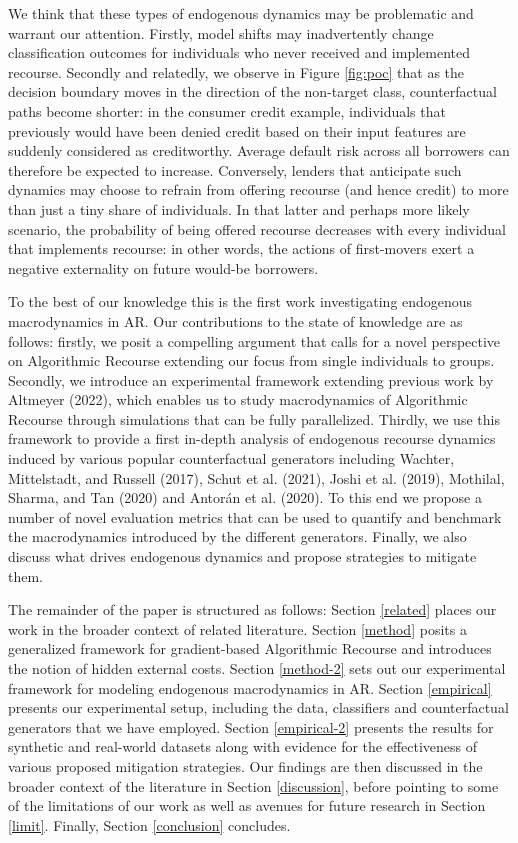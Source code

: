 \documentclass[conference,final,]{IEEEtran}
\begin{document}
We think that these types of endogenous dynamics may be problematic and warrant our attention. Firstly, model shifts may inadvertently change classification outcomes for individuals who never received and implemented recourse. Secondly and relatedly, we observe in Figure \ref{fig:poc} that as the decision boundary moves in the direction of the non-target class, counterfactual paths become shorter: in the consumer credit example, individuals that previously would have been denied credit based on their input features are suddenly considered as creditworthy. Average default risk across all borrowers can therefore be expected to increase. Conversely, lenders that anticipate such dynamics may choose to refrain from offering recourse (and hence credit) to more than just a tiny share of individuals. In that latter and perhaps more likely scenario, the probability of being offered recourse decreases with every individual that implements recourse: in other words, the actions of first-movers exert a negative externality on future would-be borrowers.

To the best of our knowledge this is the first work investigating endogenous macrodynamics in AR. Our contributions to the state of knowledge are as follows: firstly, we posit a compelling argument that calls for a novel perspective on Algorithmic Recourse extending our focus from single individuals to groups. Secondly, we introduce an experimental framework extending previous work by Altmeyer (2022), which enables us to study macrodynamics of Algorithmic Recourse through simulations that can be fully parallelized. Thirdly, we use this framework to provide a first in-depth analysis of endogenous recourse dynamics induced by various popular counterfactual generators including Wachter, Mittelstadt, and Russell (2017), Schut et al. (2021), Joshi et al. (2019), Mothilal, Sharma, and Tan (2020) and Antorán et al. (2020). To this end we propose a number of novel evaluation metrics that can be used to quantify and benchmark the macrodynamics introduced by the different generators. Finally, we also discuss what drives endogenous dynamics and propose strategies to mitigate them.

The remainder of the paper is structured as follows: Section \ref{related} places our work in the broader context of related literature. Section \ref{method} posits a generalized framework for gradient-based Algorithmic Recourse and introduces the notion of hidden external costs. Section \ref{method-2} sets out our experimental framework for modeling endogenous macrodynamics in AR. Section \ref{empirical} presents our experimental setup, including the data, classifiers and counterfactual generators that we have employed. Section \ref{empirical-2} presents the results for synthetic and real-world datasets along with evidence for the effectiveness of various proposed mitigation strategies. Our findings are then discussed in the broader context of the literature in Section \ref{discussion}, before pointing to some of the limitations of our work as well as avenues for future research in Section \ref{limit}. Finally, Section \ref{conclusion} concludes.
\end{document}
